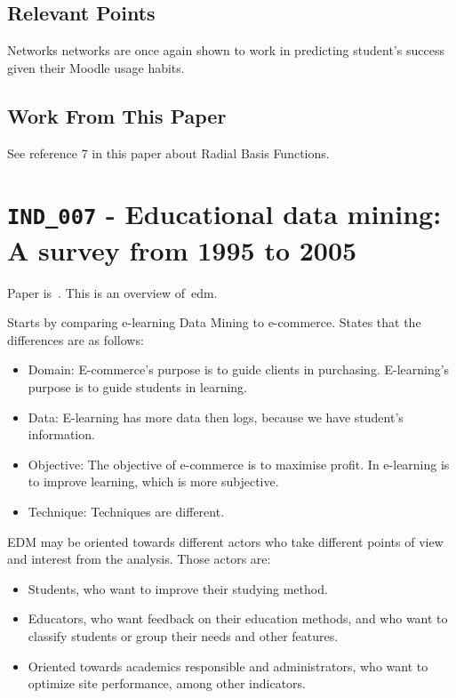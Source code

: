 \subsection{Relevant Points}

Networks networks are once again shown to work in predicting student's success
given their Moodle usage habits.

\subsection{Work From This Paper}

See reference 7 in this paper about Radial Basis Functions.

\section{\texttt{IND\_007} - Educational data mining: A survey from 1995 to
2005}

Paper is~\cite{ind_007}. This is an overview of~\gls{edm}.

Starts by comparing e-learning Data Mining to e-commerce. States that the
differences are as follows:

\begin{itemize}
    \item Domain: E-commerce's purpose is to guide clients in purchasing.
        E-learning's purpose is to guide students in learning.
    \item Data: E-learning has more data then logs, because we have student's
        information.
    \item Objective: The objective of e-commerce is to maximise profit. In
        e-learning is to improve learning, which is more subjective.
    \item Technique: Techniques are different.
\end{itemize}

EDM may be oriented towards different actors who take different points of view
and interest from the analysis. Those actors are:

\begin{itemize}
    \item Students, who want to improve their studying method.
    \item Educators, who want feedback on their education methods, and who want
        to classify students or group their needs and other features.
    \item Oriented towards academics responsible and administrators, who want
        to optimize site performance, among other indicators.
\end{itemize}

